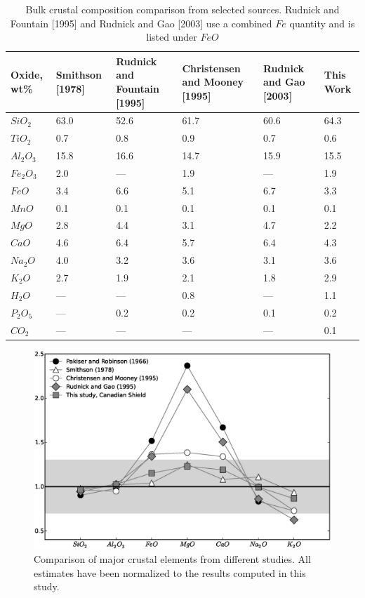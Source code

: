 \documentclass[draft, 12pt]{article}
\begin{document}
\begin{table}
  \begin{tabular}{ p{2cm} p{2cm} p{2cm} p{2cm} p{2cm} p{2cm} }
    \hline
    Oxide, wt\% & Smithson [1978] & Rudnick and Fountain [1995] & Christensen and Mooney [1995] & Rudnick and Gao [2003] & This Work \\
    \hline
    $SiO_2$   & 63.0 & 52.6 & 61.7 & 60.6 & 64.3 \\
    $TiO_2$   & 0.7 & 0.8 & 0.9 & 0.7 & 0.6 \\
    $Al_2O_3$ & 15.8 & 16.6 & 14.7 & 15.9 & 15.5 \\
    $Fe_2O_3$ & 2.0 & --- & 1.9 & --- & 1.9 \\
    $FeO$     & 3.4 & 6.6 & 5.1 & 6.7 & 3.3 \\
    $MnO$     & 0.1 & 0.1 & 0.1 & 0.1 & 0.1 \\
    $MgO$     & 2.8 & 4.4 & 3.1 & 4.7 & 2.2 \\
    $CaO$     & 4.6 & 6.4 & 5.7 & 6.4 & 4.3 \\
    $Na_2O$   & 4.0 & 3.2 & 3.6 & 3.1 & 3.6 \\
    $K_2O$    & 2.7 & 1.9 & 2.1 & 1.8 & 2.9 \\
    $H_2O$    & --- & --- & 0.8 & --- & 1.1 \\
    $P_2O_5$  & --- & 0.2 & 0.2 & 0.1 & 0.2 \\
    $CO_2$    & --- & --- & --- & --- & 0.1 \\
    \hline
  \end{tabular}
  \caption{Bulk crustal composition comparison from selected sources. Rudnick and Fountain [1995] and Rudnick and Gao [2003] use a combined $Fe$ quantity and is listed under $FeO$}
\label{table:composition}

\end{table}

\begin{figure}
  \centering
  \includegraphics[width=\textwidth]{composition}
  \caption{Comparison of major crustal elements from different studies. All estimates have been normalized to the results computed in this study.}
  \label{fig:composition}
\end{figure}
\end{document}
